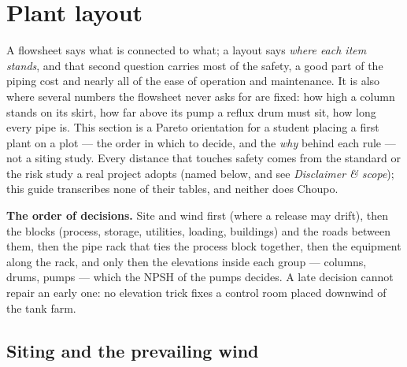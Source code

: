 \documentclass[11pt,a4paper]{article}
\begin{document}
\hypertarget{plant-layout}{%
\section{Plant layout}\label{plant-layout}}\label{sec:plant-layout}

A flowsheet says what is connected to what; a layout says \emph{where
each item stands}, and that second question carries most of the safety,
a good part of the piping cost and nearly all of the ease of operation
and maintenance. It is also where several numbers the flowsheet never
asks for are fixed: how high a column stands on its skirt, how far above
its pump a reflux drum must sit, how long every pipe is. This section is
a Pareto orientation for a student placing a first plant on a plot ---
the order in which to decide, and the \emph{why} behind each rule --- not
a siting study. Every distance that touches safety comes from the
standard or the risk study a real project adopts (named below, and see
\emph{Disclaimer \& scope}); this guide transcribes none of their
tables, and neither does Choupo.

\textbf{The order of decisions.} Site and wind first (where a release
may drift), then the blocks (process, storage, utilities, loading,
buildings) and the roads between them, then the pipe rack that ties the
process block together, then the equipment along the rack, and only then
the elevations inside each group --- columns, drums, pumps --- which the
NPSH of the pumps decides. A late decision cannot repair an early one:
no elevation trick fixes a control room placed downwind of the tank farm.

\hypertarget{siting-and-the-prevailing-wind}{%
\subsection{Siting and the prevailing
wind}\label{siting-and-the-prevailing-wind}}
\end{document}
